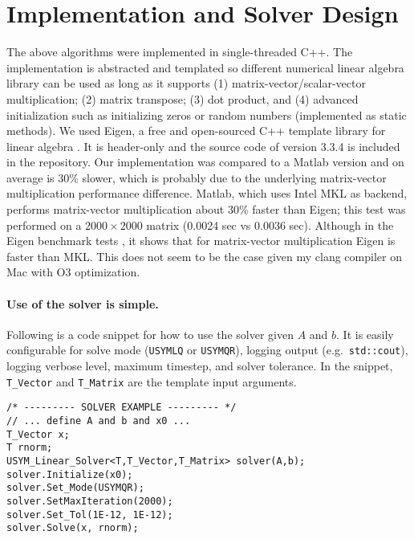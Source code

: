 \documentclass[10pt,letterpaper]{article}
\newcommand{\alg}[1]{\textproc{#1}}
\begin{document}
\section{Implementation and Solver Design} 
The above algorithms were implemented in single-threaded C++. The 
implementation is abstracted and templated so different numerical 
linear algebra library can be used as long as it supports 
(1) matrix-vector/scalar-vector multiplication; (2) matrix transpose; 
(3) dot product, and (4) advanced initialization such as initializing 
zeros or random numbers (implemented as static methods). We used Eigen,
a free and open-sourced C++ template library for linear algebra 
\cite{sw:Eigen}. It is header-only and the source code of version 3.3.4
is included in the repository. Our \alg{USYMLQ} implementation was compared 
to a Matlab version and on average is $30\%$ slower, which is probably 
due to the underlying matrix-vector multiplication performance difference.
Matlab, which uses Intel MKL as backend, performs matrix-vector 
multiplication about $30\%$ faster than Eigen; this test was performed 
on a $2000\times 2000$ matrix (0.0024 sec vs 0.0036 sec). 
Although in the Eigen benchmark tests \cite{sw:EigenBenchmark}, it shows 
that for matrix-vector multiplication Eigen is faster than MKL. 
This does not seem to be the case given my clang compiler on Mac with 
O3 optimization. \\

\paragraph{Use of the solver is simple.} Following is a code snippet for 
how to use the solver given $A$ and $b$. It is easily configurable for 
solve mode (\texttt{USYMLQ} or \texttt{USYMQR}), logging output 
(e.g.~\texttt{std::cout}), logging verbose level, maximum timestep, and 
solver tolerance. In the snippet, \texttt{T\_Vector} and \texttt{T\_Matrix} 
are the template input arguments. 
\begin{lstlisting}
/* --------- SOLVER EXAMPLE --------- */         
// ... define A and b and x0 ... 
T_Vector x; 
T rnorm; 
USYM_Linear_Solver<T,T_Vector,T_Matrix> solver(A,b); 
solver.Initialize(x0); 
solver.Set_Mode(USYMQR);
solver.SetMaxIteration(2000);
solver.Set_Tol(1E-12, 1E-12);
solver.Solve(x, rnorm); 
\end{lstlisting}
\end{document}
